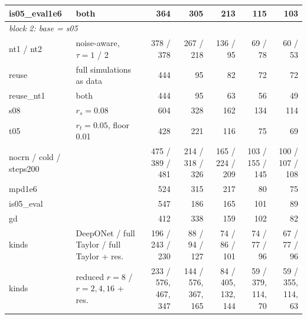\documentclass[11pt,a4paper]{article}
\begin{document}
\begin{table}[h]
{\begin{tabular}{llrrrrr}
is05\_eval1e6 & both & 364 & 305 & 213 & 115 & 103 \\
\midrule
\multicolumn{7}{l}{\emph{block 2: base = s05}} \\
nt1 / nt2 & noise-aware, $\tau=1$ / 2 & 378 / 378 & 267 / 218 & 136 / 95 & 69 / 78 & 60 / 53 \\
reuse & full simulations as data & 444 & 95 & 82 & 72 & 72 \\
reuse\_nt1 & both & 444 & 95 & 63 & 56 & 49 \\
s08 & $r_s=0.08$ & 604 & 328 & 162 & 134 & 114 \\
t05 & $r_t=0.05$, floor 0.01 & 428 & 221 & 116 & 75 & 69 \\
nocrn / cold / steps200 & & 475 / 389 / 481 & 214 / 318 / 326 & 165 / 224 / 209 & 103 / 155 / 145 & 100 / 107 / 108 \\
mpd1e6 & & 524 & 315 & 217 & 80 & 75 \\
is05\_eval & & 547 & 186 & 165 & 101 & 89 \\
gd & & 412 & 338 & 159 & 102 & 82 \\
kinds & DeepONet / full Taylor / full Taylor + res. & 196 / 243 / 230 & 88 / 94 / 127 & 74 / 86 / 101 & 74 / 77 / 96 & 67 / 77 / 96 \\
kinds & reduced $r{=}8$ / $r{=}2,4,16$ + res. & 233 / 576, 467, 347 & 144 / 576, 367, 165 & 84 / 405, 132, 144 & 59 / 379, 114, 70 & 59 / 355, 114, 63 \\
\bottomrule
\end{tabular}}
\end{table}
\end{document}
